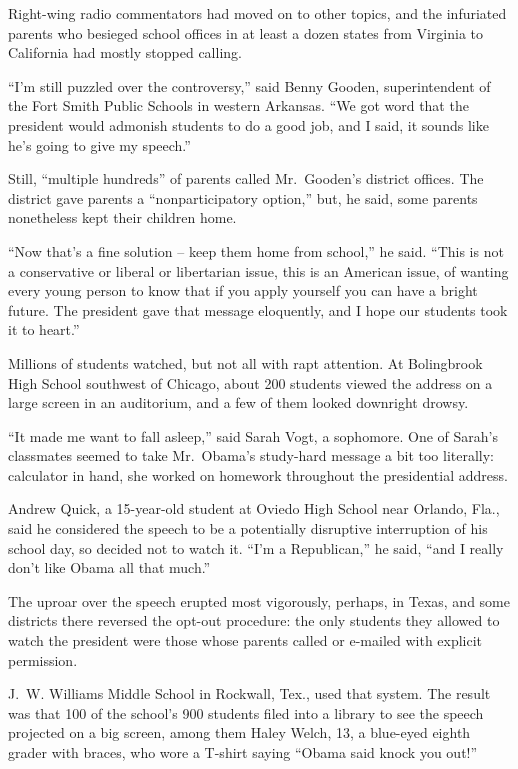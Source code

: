 ﻿\documentclass[12pt]{article}
\begin{document}
Right-wing radio commentators had moved on to other topics, and the infuriated parents who besieged
school offices in at least a dozen states from Virginia to California had mostly stopped calling.

``I'm still puzzled over the controversy,'' said Benny Gooden, superintendent of the Fort Smith
Public Schools in western Arkansas. ``We got word that the president would admonish students to do a
good job, and I said, it sounds like he's going to give my speech.''

Still, ``multiple hundreds'' of parents called Mr.~Gooden's district offices. The district gave
parents a ``nonparticipatory option,'' but, he said, some parents nonetheless kept their children
home.

``Now that's a fine solution -- keep them home from school,'' he said. ``This is not a conservative
or liberal or libertarian issue, this is an American issue, of wanting every young person to know
that if you apply yourself you can have a bright future. The president gave that message eloquently,
and I hope our students took it to heart.''

Millions of students watched, but not all with rapt attention. At Bolingbrook High School southwest
of Chicago, about 200 students viewed the address on a large screen in an auditorium, and a few of
them looked downright drowsy.

``It made me want to fall asleep,'' said Sarah Vogt, a sophomore. One of Sarah's classmates seemed
to take Mr.~Obama's study-hard message a bit too literally: calculator in hand, she worked on
homework throughout the presidential address.

Andrew Quick, a 15-year-old student at Oviedo High School near Orlando, Fla., said he considered the
speech to be a potentially disruptive interruption of his school day, so decided not to watch it.
``I'm a Republican,'' he said, ``and I really don't like Obama all that much.''

The uproar over the speech erupted most vigorously, perhaps, in Texas, and some districts there
reversed the opt-out procedure: the only students they allowed to watch the president were those
whose parents called or e-mailed with explicit permission.

J.~W. Williams Middle School in Rockwall, Tex., used that system. The result was that 100 of the
school's 900 students filed into a library to see the speech projected on a big screen, among them
Haley Welch, 13, a blue-eyed eighth grader with braces, who wore a T-shirt saying ``Obama said knock
you out!''
\end{document}
